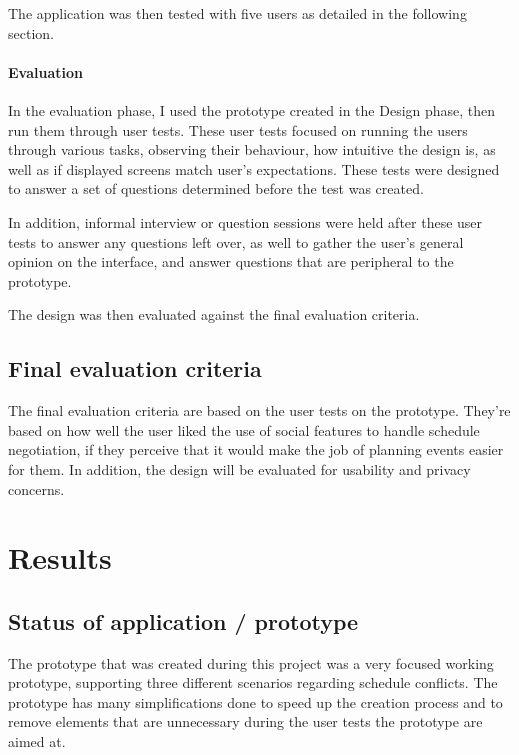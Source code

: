 \documentclass[a4paper,11pt]{report}
\begin{document}
The application was then tested with five users as detailed in the following
section.

\subsubsection{Evaluation}

In the evaluation phase, I used the prototype created in the Design phase, then
run them through user tests. These user tests focused on running the users
through various tasks, observing their behaviour, how intuitive the design is,
as well as if displayed screens match user's expectations. These tests were
designed to answer a set of questions determined before the test was created.

In addition, informal interview or question sessions were held after these user
tests to answer any questions left over, as well to gather the user's general
opinion on the interface, and answer questions that are peripheral to the
prototype.

The design was then evaluated against the final evaluation criteria.

\section{Final evaluation criteria}

The final evaluation criteria are based on the user tests on the
prototype. They're based on how well the user liked the use of social features
to handle schedule negotiation, if they perceive that it would make the job of
planning events easier for them. In addition, the design will be evaluated for
usability and privacy concerns.

\chapter{Results}

\section{Status of application / prototype}

The prototype that was created during this project was a very focused working
prototype, supporting three different scenarios regarding schedule
conflicts. The prototype has many simplifications done to speed up the creation
process and to remove elements that are unnecessary during the user tests the
prototype are aimed at.
\end{document}
